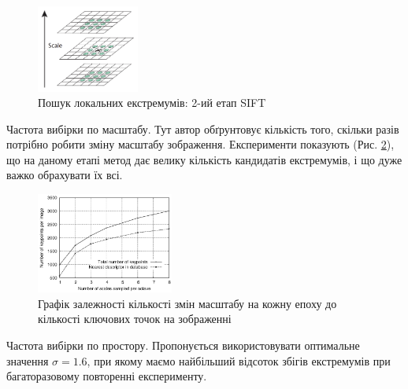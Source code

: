 \begin{enumerate}
          \begin{figure}[H]
              \centering
              \includegraphics[width=0.3\textwidth]{images/sift2}
              \caption{Пошук локальних екстремумів: 2-ий етап SIFT \cite{sift}
                  \label{fig:swift2}
              }
          \end{figure}

          \subitem Частота вибірки по масштабу. Тут автор обґрунтовує кількість того, 
          скільки разів потрібно робити зміну масштабу зображення. 
          Експерименти показують (Рис. \ref{fig:swift3}),
          що на даному етапі метод дає велику кількість кандидатів екстремумів,
          і що дуже важко обрахувати їх всі.

          \begin{figure}[H]
              \centering
              \includegraphics[width=0.4\textwidth]{images/sift3}
              \caption{Графік залежності кількості змін масштабу на кожну епоху до
                  кількості ключових точок на зображенні \cite{sift}
                  \label{fig:swift3}
              }
          \end{figure}
          \subitem Частота вибірки по простору. Пропонується використовувати оптимальне значення 
          $\sigma = 1.6$, при якому
          маємо найбільший відсоток збігів екстремумів при багаторазовому повторенні
          експерименту.


\end{enumerate}
